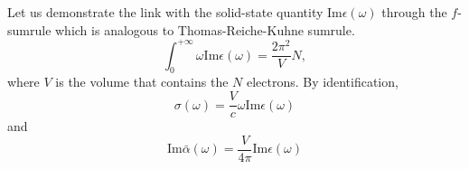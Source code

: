 \documentclass[aps,prb,reprint,showpacs]{revtex4-1}
\begin{document}
Let us demonstrate the link with the solid-state quantity $\mathrm{Im} \epsilon(\omega)$
through the $f$-sumrule which is analogous to Thomas-Reiche-Kuhne sumrule.
\begin{equation}
 \int_0^{+\infty} \omega \mathrm{Im}\epsilon(\omega) = \frac{2\pi^2}{V} N ,
\end{equation}
where $V$ is the volume that contains the $N$ electrons.
By identification, 
\begin{equation}
 \sigma(\omega) = \frac{V}{c} \omega \mathrm{Im}\epsilon(\omega)
\end{equation}
and
\begin{equation}
 \mathrm{Im} \bar\alpha(\omega) = \frac{V}{4\pi} \mathrm{Im}\epsilon(\omega)
\end{equation}
\end{document}

